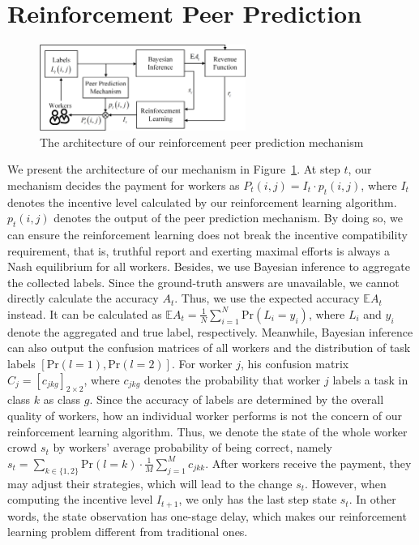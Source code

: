 \documentclass{article}
\begin{document}
\section{Reinforcement Peer Prediction}
\begin{figure}[htb]
        \centering
        \includegraphics[width=0.6\textwidth]{image/Mechanism}
        \caption{\label{ED1} The architecture of our reinforcement peer prediction mechanism}
\end{figure}
We present the architecture of our mechanism in Figure~\ref{ED1}. At step $t$, our mechanism decides the payment for workers as $P_{t}(i,j)=I_t \cdot p_{t}(i,j)$, where $I_t$ denotes the incentive level calculated by our reinforcement learning algorithm.
$p_t(i,j)$ denotes the output of the peer prediction mechanism.
By doing so, we can ensure the reinforcement learning does not break the incentive compatibility requirement, that is, truthful report and exerting maximal efforts is always a Nash equilibrium for all workers.
Besides, we use Bayesian inference to aggregate the collected labels.
Since the ground-truth answers are unavailable, we cannot directly calculate the accuracy $A_t$.
Thus, we use the expected accuracy $\mathbb{E}A_t$ instead.
It can be calculated as $\mathbb{E}A_t = \frac{1}{N}\sum_{i=1}^{N} \textrm{Pr}(L_i = y_i)$, where $L_i$ and $y_i$ denote the aggregated and true label, respectively.
Meanwhile, Bayesian inference can also output the confusion matrices of all workers and the distribution of task labels $\left[\textrm{Pr}(l=1), \textrm{Pr}(l=2)\right]$.
For worker $j$, his confusion matrix $C_j = [c_{jkg}]_{2\times 2}$, where $c_{jkg}$ denotes the probability that worker $j$ labels a task in class $k$ as class $g$.
Since the accuracy of labels are determined by the overall quality of workers, how an individual worker performs is not the concern of our reinforcement learning algorithm.
Thus, we denote the state of the whole worker crowd $s_t$ by workers' average probability of being correct, namely $s_t = \sum_{k\in\{1,2\}}\textrm{Pr}(l=k)\cdot \frac{1}{M}\sum_{j=1}^{M}c_{jkk}$.
After workers receive the payment, they may adjust their strategies, which will lead to the change $s_t$.
However, when computing the incentive level $I_{t+1}$, we only has the last step state $s_t$.
In other words, the state observation has one-stage delay, which makes our reinforcement learning problem different from traditional ones.
\end{document}
